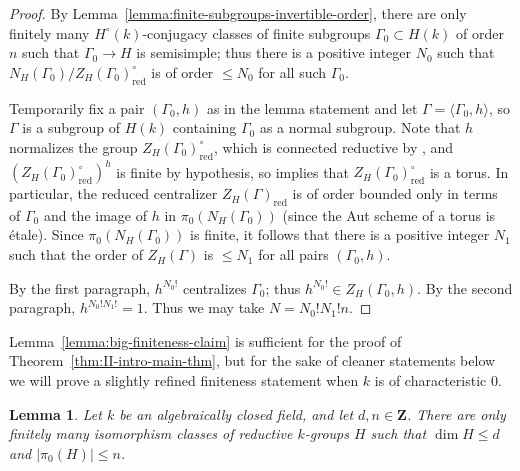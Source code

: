 \documentclass[reqno]{amsart}
\numberwithin{equation}{subsection}
\newcommand{\Z}{\mathbf{Z}}
\DeclareMathOperator{\red}{red}
\newtheorem{lemma}[thm]{Lemma}
\theoremstyle{remark}
\numberwithin{equation}{subsection}
\numberwithin{figure}{subsection}
\begin{document}
\begin{proof}
By Lemma~\ref{lemma:finite-subgroups-invertible-order}, there are only finitely many $H^\circ(k)$-conjugacy classes of finite subgroups $\Gamma_0 \subset H(k)$ of order $n$ such that $\Gamma_0 \to H$ is semisimple; thus there is a positive integer $N_0$ such that $N_H(\Gamma_0)/Z_H(\Gamma_0)^\circ_{\mathrm{red}}$ is of order $\leq N_0$ for all such $\Gamma_0$.

Temporarily fix a pair $(\Gamma_0, h)$ as in the lemma statement and let $\Gamma = \langle \Gamma_0, h\rangle$, so $\Gamma$ is a subgroup of $H(k)$ containing $\Gamma_0$ as a normal subgroup. Note that $h$ normalizes the group $Z_H(\Gamma_0)_{\mathrm{red}}^\circ$, which is connected reductive by \cite[Proposition 3.12]{BMR05}, and $(Z_H(\Gamma_0)_{\mathrm{red}}^\circ)^h$ is finite by hypothesis, so \cite[Lemma~10.1.1]{CF26a} implies that $Z_H(\Gamma_0)_{\mathrm{red}}^\circ$ is a torus. In particular, the reduced centralizer $Z_H(\Gamma)_{\red}$ is of order bounded only in terms of $\Gamma_0$ and the image of $h$ in $\pi_0(N_H(\Gamma_0))$ (since the Aut scheme of a torus is \'etale). Since $\pi_0(N_H(\Gamma_0))$ is finite, it follows that there is a positive integer $N_1$ such that the order of $Z_H(\Gamma)$ is $\leq N_1$ for all pairs $(\Gamma_0, h)$.

By the first paragraph, $h^{N_0!}$ centralizes $\Gamma_0$; thus $h^{N_0!} \in Z_H(\Gamma_0, h)$. By the second paragraph, $h^{N_0! N_1!} = 1$. Thus we may take $N = N_0! N_1! n$.
\end{proof}

Lemma~\ref{lemma:big-finiteness-claim} is sufficient for the proof of Theorem~\ref{thm:II-intro-main-thm}, but for the sake of cleaner statements below we will prove a slightly refined finiteness statement when $k$ is of characteristic $0$.

\begin{lemma}\label{lemma:finitely-many-iso-classes}
Let $k$ be an algebraically closed field, and let $d, n \in \Z$. There are only finitely many isomorphism classes of reductive $k$-groups $H$ such that $\dim H \leq d$ and $|\pi_0(H)| \leq n$.
\end{lemma}
\end{document}
